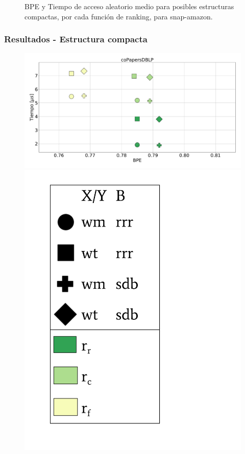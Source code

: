 \begin{frame}
\begin{figure}
	\caption{BPE y Tiempo de acceso aleatorio medio para posibles estructuras compactas, por cada función de ranking, para snap-amazon.}
\end{figure}

\end{frame}

\begin{frame}
\frametitle{Resultados - Estructura compacta}

\begin{figure}
	\centering
	
    	\begin{minipage}{1\textwidth}
    		\centering
    		\begin{minipage}{0.8\textwidth}
    			\centering
    			\includegraphics[width=1\linewidth]{../img/sdsl/aleatorioBig/coPapersDBLP.pdf}
    		\end{minipage}
    		\begin{minipage}{0.15\textwidth}
    			\centering
    			\includegraphics[scale=.15, clip, trim=70 0 0 0]{../img/sdsl/label.pdf}

\end{minipage}
\end{minipage}
\end{figure}
\end{frame}
